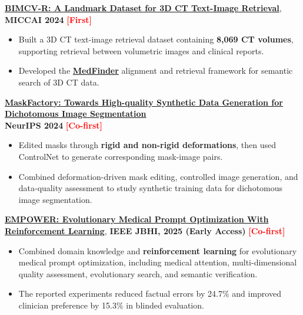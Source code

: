 \documentclass{resume}
\begin{document}
\begin{enumerate}[label=\textbf{[\arabic*]}, leftmargin=2em, itemsep=3pt]
    \item \textbf{\href{https://arxiv.org/abs/2403.15992}{BIMCV-R: A Landmark Dataset for 3D CT Text-Image Retrieval}}, \textbf{MICCAI 2024} \hfill \mbox{\textcolor{red}{\textbf{[First]}}}
    \begin{itemize}
        \item Built a 3D CT text-image retrieval dataset containing \textbf{8,069 CT volumes}, supporting retrieval between volumetric images and clinical reports.
        \item Developed the \href{https://github.com/ydchen0806/MedFinder}{\textbf{MedFinder}} alignment and retrieval framework for semantic search of 3D CT data.
    \end{itemize}

    \item \textbf{\href{https://arxiv.org/abs/2412.19080}{MaskFactory: Towards High-quality Synthetic Data Generation for Dichotomous Image Segmentation}} \\
    \textbf{NeurIPS 2024} \hfill \mbox{\textcolor{red}{\textbf{[Co-first]}}}
    \begin{itemize}
        \item Edited masks through \textbf{rigid and non-rigid deformations}, then used ControlNet to generate corresponding mask-image pairs.
        \item Combined deformation-driven mask editing, controlled image generation, and data-quality assessment to study synthetic training data for dichotomous image segmentation.
    \end{itemize}

    \item \textbf{\href{https://ieeexplore.ieee.org/document/11205280}{EMPOWER: Evolutionary Medical Prompt Optimization With Reinforcement Learning}}, \textbf{IEEE JBHI, 2025 (Early Access)} \hfill \mbox{\textcolor{red}{\textbf{[Co-first]}}}
    \begin{itemize}
        \item Combined domain knowledge and \textbf{reinforcement learning} for evolutionary medical prompt optimization, including medical attention, multi-dimensional quality assessment, evolutionary search, and semantic verification.
        \item The reported experiments reduced factual errors by 24.7\% and improved clinician preference by 15.3\% in blinded evaluation.
    \end{itemize}

\end{enumerate}
\end{document}
